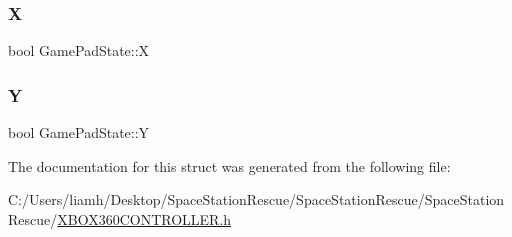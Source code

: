 \mbox{\label{struct_game_pad_state_ab2e5b135935f6e41ce12fe31099023b9}} 
\subsubsection{\texorpdfstring{X}{X}}
{\footnotesize\ttfamily bool Game\+Pad\+State\+::X}

\mbox{\label{struct_game_pad_state_a5161d220f41ed2c01c79b4d6b0636588}} 
\subsubsection{\texorpdfstring{Y}{Y}}
{\footnotesize\ttfamily bool Game\+Pad\+State\+::Y}



The documentation for this struct was generated from the following file\+:\begin{DoxyCompactItemize}
\item 
C\+:/\+Users/liamh/\+Desktop/\+Space\+Station\+Rescue/\+Space\+Station\+Rescue/\+Space\+Station\+Rescue/\mbox{\hyperlink{_x_b_o_x360_c_o_n_t_r_o_l_l_e_r_8h}{X\+B\+O\+X360\+C\+O\+N\+T\+R\+O\+L\+L\+E\+R.\+h}}\end{DoxyCompactItemize}
